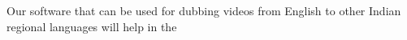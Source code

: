 \documentclass[preview]{standalone}
\begin{document}
\begin{flushleft}
\fontsize{15}{0}\selectfont Our software that can be used for dubbing videos from English to other Indian regional languages will help in the
\end{flushleft}
\end{document}
